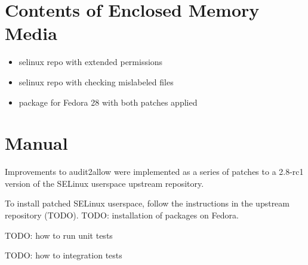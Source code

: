 
\chapter{Contents of Enclosed Memory Media}

\begin{itemize}
    \item selinux repo with extended permissions
    \item selinux repo with checking mislabeled files
    \item package for Fedora 28 with both patches applied
\end{itemize}

\chapter{Manual}

Improvements to audit2allow were implemented as a series of patches to a 2.8-rc1
version of the SELinux userspace upstream repository.

To install patched SELinux userspace, follow the instructions in the upstream
repository (TODO). TODO: installation of packages on Fedora.

TODO: how to run unit tests

TODO: how to integration tests





